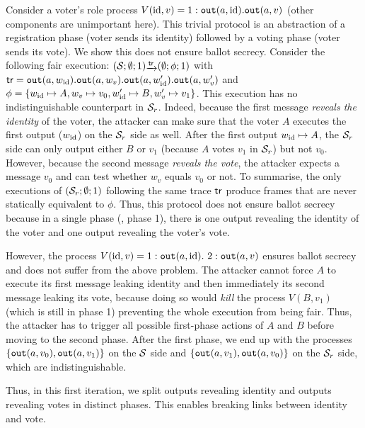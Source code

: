 \label{sec:app:conditions}
\begin{example}
\label{ex:app-leaking-phases}
  Consider a voter's role process $V(\id,v)=
\phase 1 \Out(a,\id).\Out(a,v)$
  (other components are unimportant here).
  This trivial protocol is an abstraction of a registration phase
  (voter sends its identity) followed by a voting phase (voter sends
  its vote).  We show this does not ensure ballot secrecy.
  Consider the following fair execution:
  $(\S;\emptyset;1)\sint{\tr}(\emptyset;\phi;1)$
  with $\tr=\Out(a,w_\id).\Out(a,w_v).
\Out(a,w_\id').\Out(a,w_v')$
  and $\phi=\{w_\id\mapsto A, w_v\mapsto v_0, w_\id'\mapsto B,w_v'\mapsto v_1\}$.
  This execution has no indistinguishable counterpart in $\S_r$.
  Indeed, because the first message {\em reveals the identity} of the voter, 
  the attacker can make sure that the voter $A$ executes the first output (\ie $w_\id$)
  on the $\S_r$ side as well.
  After the first output $w_\id\mapsto A$, the $\S_r$ side can only output either $B$ or $v_1$
  (because $A$ votes $v_1$ in $\S_r$) but not $v_0$.
  However, because the second message {\em reveals the vote}, the attacker expects a message
  $v_0$ and can test whether $w_v$ equals $v_0$ or not.
  To summarise, the only executions of $(\S_r;\emptyset;1)$ following the same trace $\tr$
  produce frames that are never statically equivalent to $\phi$.
  Thus, this  protocol does not ensure ballot secrecy because %
  in a single phase (\ie, phase 1), there is one output revealing the identity
  of the voter and one output revealing the voter's vote.

  However, the process $V(\id,v)=\phase 1 \Out(a,\id).\ \phase 2 \Out(a,v)$ ensures
  ballot secrecy and does not suffer from the above problem.  
  The attacker cannot force $A$ to execute its first message leaking
  identity and then immediately its second message leaking its vote,
  because doing so would {\em kill} the process $V(B,v_1)$ (which is still in phase 1)
  preventing the whole execution from being fair.
  Thus, the attacker has to trigger all
  possible first-phase actions of $A$ and $B$ before moving to
  the second phase.
  After the first phase, we end up with
  the processes $\{\Out(a,v_0), \Out(a,v_1)\}$ on the $\S$ side and
  $\{\Out(a,v_1),\Out(a,v_0)\}$ on the $\S_r$ side, which are indistinguishable.
  
  Thus,
  in this first iteration, we split
  outputs revealing identity and outputs revealing votes in distinct
  phases. This enables breaking links between identity and vote.
\end{example}


